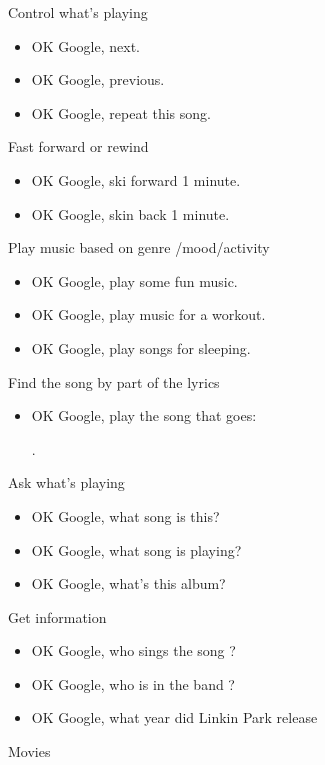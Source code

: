 \documentclass[
  a4paper,
]{article}
\providecommand{\tightlist}{%
  \setlength{\itemsep}{0pt}\setlength{\parskip}{0pt}}\usepackage{longtable,booktabs,array}
\begin{document}
Control what's playing

\begin{itemize}
\item
  OK Google, next.
\item
  OK Google, previous.
\item
  OK Google, repeat this song.
\end{itemize}

Fast forward or rewind

\begin{itemize}
\item
  OK Google, ski forward 1 minute.
\item
  OK Google, skin back 1 minute.
\end{itemize}

Play music based on genre /mood/activity

\begin{itemize}
\item
  OK Google, play some fun music.
\item
  OK Google, play music for a workout.
\item
  OK Google, play songs for sleeping.
\end{itemize}

Find the song by part of the lyrics

\begin{itemize}
\tightlist
\item
  OK Google, play the song that goes:

  .
\end{itemize}

Ask what's playing

\begin{itemize}
\item
  OK Google, what song is this?
\item
  OK Google, what song is playing?
\item
  OK Google, what's this album?
\end{itemize}

Get information

\begin{itemize}
\item
  OK Google, who sings the song ?
\item
  OK Google, who is in the band ?
\item
  OK Google, what year did Linkin Park release
\end{itemize}

Movies
\end{document}
